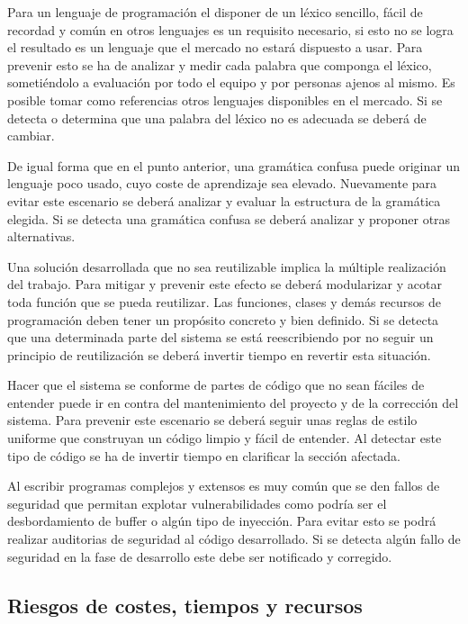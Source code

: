 Para un lenguaje de programación el disponer de un léxico sencillo, fácil de recordad y común en otros lenguajes es un requisito necesario, si esto no se logra 
el resultado es un lenguaje que el mercado no estará dispuesto a usar. Para prevenir esto se ha de analizar y medir cada palabra que componga el léxico, sometiéndolo 
a evaluación por todo el equipo y por personas ajenos al mismo. Es posible tomar como referencias otros lenguajes disponibles en el mercado. 
Si se detecta o determina que una palabra del léxico no es adecuada se deberá de cambiar. 

De igual forma que en el punto anterior, una gramática confusa puede originar un lenguaje poco usado, cuyo coste de aprendizaje sea elevado. Nuevamente para evitar este
escenario se deberá analizar y evaluar la estructura de la gramática elegida. Si se detecta una gramática confusa se deberá analizar y proponer otras alternativas.

Una solución desarrollada que no sea reutilizable implica la múltiple realización del trabajo. Para mitigar y prevenir este efecto se deberá modularizar y acotar toda 
función que se pueda reutilizar. Las funciones, clases y demás recursos de programación deben tener un propósito concreto y bien definido. Si se detecta que una determinada parte del 
sistema se está reescribiendo por no seguir un principio de reutilización se deberá invertir tiempo en revertir esta situación.

Hacer que el sistema se conforme de partes de código que no sean fáciles de entender puede ir en contra del mantenimiento del proyecto y de la corrección del sistema. Para prevenir 
este escenario se deberá seguir unas reglas de estilo uniforme que construyan un código limpio y fácil de entender. Al detectar este tipo de código se ha de invertir tiempo en clarificar la
sección afectada. 

Al escribir programas complejos y extensos es muy común que se den fallos de seguridad que permitan explotar vulnerabilidades como podría ser el desbordamiento de buffer o 
algún tipo de inyección. Para evitar esto se podrá realizar auditorias de seguridad al código desarrollado. Si se detecta algún fallo de seguridad en la fase de desarrollo este 
debe ser notificado y corregido. 




\subsection{Riesgos de costes, tiempos y recursos}


